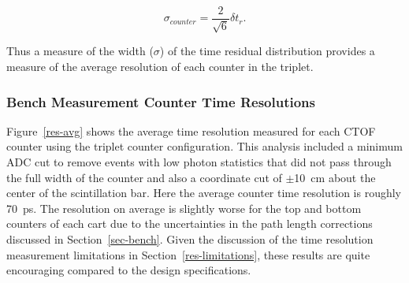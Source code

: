 \documentclass{elsart}
\begin{document}
\begin{equation}
\label{sig-counter}
\sigma_{counter} = \frac{2}{\sqrt{6}} \delta t_r.
\end{equation}

\noindent
Thus a measure of the width ($\sigma$) of the time residual distribution provides a measure of the
average resolution of each counter in the triplet. 

\subsubsection{Bench Measurement Counter Time Resolutions}
\label{bench-tres}

Figure~\ref{res-avg} shows the average time resolution measured for each CTOF counter using the
triplet counter configuration. This analysis included a minimum ADC cut to remove events with low
photon statistics that did not pass through the full width of the counter and also a coordinate cut of
$\pm$10~cm about the center of the scintillation bar. Here the average counter time resolution is
roughly 70~ps. The resolution on average is slightly worse for the top and bottom counters of each
cart due to the uncertainties in the path length corrections discussed in Section~\ref{sec-bench}.
Given the discussion of the time resolution measurement limitations in Section~\ref{res-limitations},
these results are quite encouraging compared to the design specifications.
\end{document}
